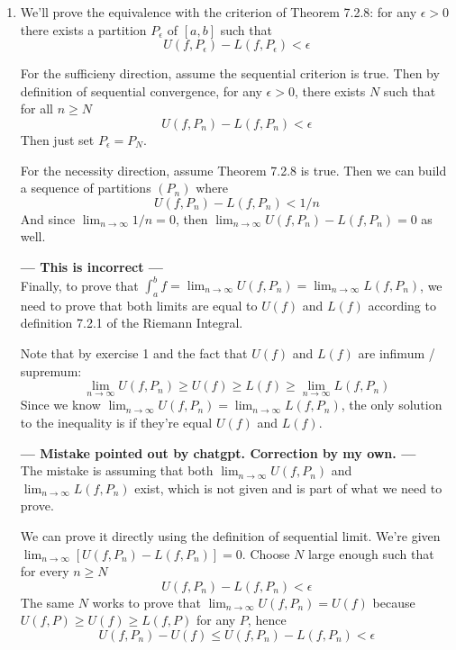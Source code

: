 \documentclass{oxmathproblems}
\begin{document}
\begin{questions}
\begin{solution}
  \begin{enumerate}[label=(\alph*)]
    \item We'll prove the equivalence with the criterion of Theorem 7.2.8: for any $\epsilon > 0$ there exists a partition $P_{\epsilon}$ of $[a, b]$ such that
    \[U(f, P_{\epsilon}) - L(f, P_{\epsilon}) < \epsilon\]

    For the sufficieny direction, assume the sequential criterion is true. Then by definition of sequential convergence, for any $\epsilon > 0$, there exists $N$
    such that for all $n \geq N$
    \[U(f, P_{n}) - L(f, P_{n}) < \epsilon\]
    Then just set $P_{\epsilon}=P_{N}$.

    For the necessity direction, assume Theorem 7.2.8 is true. Then we can build a sequence of partitions $(P_{n})$ where
    \[U(f, P_{n})-L(f, P_{n}) < 1/n\]
    And since $\lim_{n \to \infty}1/n = 0$, then $\lim_{n \to \infty}U(f, P_{n}) - L(f, P_{n})=0$ as well.

    \textbf{--- This is incorrect ---}\\
    Finally, to prove that $\int_{a}^{b}f = \lim_{n \to \infty} U(f, P_{n}) = \lim_{n \to \infty}L(f, P_{n})$, we need to prove that
    both limits are equal to $U(f)$ and $L(f)$ according to definition 7.2.1 of the Riemann Integral.
    
    Note that by exercise 1 and the fact that $U(f)$ and $L(f)$ are infimum / supremum:
    \[\lim_{n \to \infty} U(f, P_{n}) \geq U(f) \geq L(f) \geq \lim_{n \to \infty} L(f, P_{n})\]
    Since we know $\lim_{n \to \infty} U(f, P_{n}) = \lim_{n \to \infty}L(f, P_{n})$, the only solution to the inequality is if they're equal $U(f)$ and $L(f)$.

    \textbf{--- Mistake pointed out by chatgpt. Correction by my own. ---}\\
    The mistake is assuming that both $\lim_{n \to \infty} U(f, P_{n})$ and $\lim_{n \to \infty}L(f, P_{n})$ exist, which is not given and is part of what we need to prove.

    We can prove it directly using the definition of sequential limit. We're given $\lim_{n \to \infty} [U(f, P_{n}) - L(f, P_{n})] = 0$. Choose $N$ large enough
    such that for every $n \geq N$
    \[U(f, P_{n}) - L(f, P_{n}) < \epsilon\]
    The same $N$ works to prove that $\lim_{n \to \infty}U(f, P_{n})=U(f)$ because $U(f, P) \geq U(f) \geq L(f, P)$ for any $P$, hence
    \[U(f, P_{n})-U(f) \leq U(f, P_{n}) - L(f, P_{n}) < \epsilon\]


\end{enumerate}
\end{solution}
\end{questions}
\end{document}
